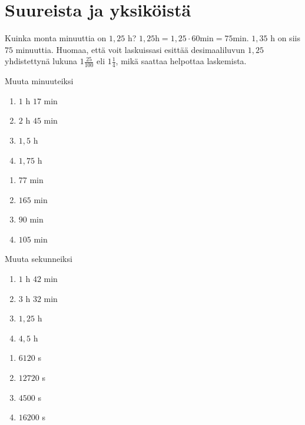 \chapter{Suureista ja yksiköistä}

\begin{esimerkki}
Kuinka monta minuuttia on $1,25$ h? $1,25 \text{h} = 1,25 \cdot 60 \text{min} = 75 \text{min}$. $1,35$ h on siis $75$ minuuttia. Huomaa, että voit laskuissasi esittää desimaaliluvun $1,25$ yhdistettynä lukuna $1 \frac{25}{100}$ eli $1 \frac{1}{4}$, mikä saattaa helpottaa laskemista.
\end{esimerkki}


\begin{tehtava}
Muuta minuuteiksi
\begin{enumerate}
\item $1$ h $17$ min
\item $2$ h $45$ min
\item $1,5$ h
\item $1,75$ h
\end{enumerate}
\begin{vastaus}
\begin{enumerate}
\item $77$ min
\item $165$ min
\item $90$ min
\item $105$ min
\end{enumerate}
\end{vastaus}
\end{tehtava}

\begin{tehtava}
Muuta sekunneiksi
\begin{enumerate}
\item $1$ h $42$ min
\item $3$ h $32$ min
\item $1,25$ h
\item $4,5$ h
\end{enumerate}
\begin{vastaus}
\begin{enumerate}
\item $6120$ s
\item $12720$ s
\item $4500$ s
\item $16200$ s
\end{enumerate}
\end{vastaus}
\end{tehtava}


